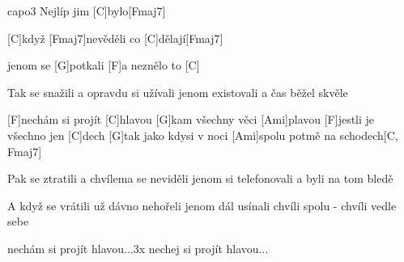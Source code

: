 \hfill capo3
Nejlíp jim [C]bylo[Fmaj7]

[C]když [Fmaj7]nevěděli co [C]dělají[Fmaj7]

jenom se [G]potkali
[F]a neznělo to [C]


Tak se snažili
a opravdu si užívali
jenom existovali
a čas běžel skvěle

[F]nechám si projít [C]hlavou
[G]kam všechny věci [Ami]plavou
[F]jestli je všechno jen [C]dech
[G]tak jako kdysi v noci
[Ami]spolu potmě na schodech[C, Fmaj7]

\slpc
Pak se ztratili
a chvílema se neviděli
jenom si telefonovali
a byli na tom bledě

A když se vrátili
už dávno nehořeli
jenom dál usínali
chvíli spolu - chvíli vedle sebe

nechám si projít hlavou...3x
nechej si projít hlavou...



